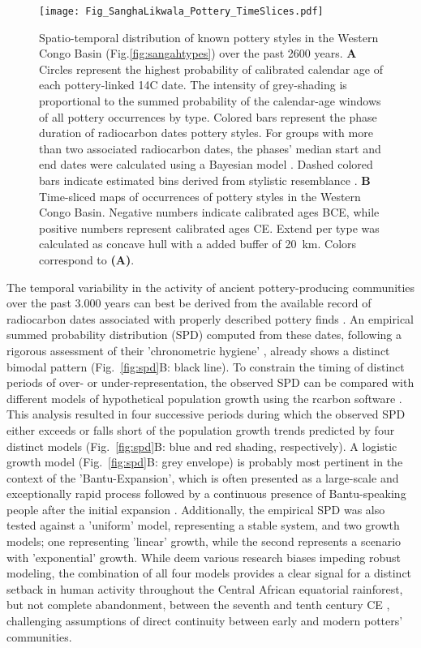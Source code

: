 \documentclass[smallextended,natbib]{svjour3}       %
\begin{document}
\begin{figure}[p]
	\centering
	\texttt{[image: Fig\_SanghaLikwala\_Pottery\_TimeSlices.pdf]}
	\caption{Spatio-temporal distribution of known pottery styles in the Western Congo Basin (Fig.\ref{fig:sangahtypes}) over the past 2600 years. \textbf{A} Circles represent the highest probability of calibrated calendar age of each pottery-linked 14C date. The intensity of grey-shading is proportional to the summed probability of the calendar-age windows of all pottery occurrences by type. Colored bars represent the phase duration of radiocarbon dates pottery styles. For groups with more than two associated radiocarbon dates, the phases' median start and end dates were calculated using a Bayesian model \citep[Fig.~S1,Tab.~S1]{Crema.2021a,Crema.2021b,Seidensticker.2024}. Dashed colored bars indicate estimated bins derived from stylistic resemblance \citep[Data S2]{Seidensticker.2021}. \textbf{B} Time-sliced maps of occurrences of pottery styles in the Western Congo Basin. Negative numbers indicate calibrated ages BCE, while positive numbers represent calibrated ages CE. Extend per type was calculated as concave hull \citep{Gombin.2017} with a added buffer of 20~km. Colors correspond to \textbf{(A)}.}
	\label{fig:timeslicemaps}
\end{figure}

The temporal variability in the activity of ancient pottery-producing communities over the past 3.000 years can best be derived from the available record of radiocarbon dates associated with properly described pottery finds \citep{Seidensticker.2021f}. An empirical summed probability distribution (SPD) computed from these dates, following a rigorous assessment of their 'chronometric hygiene' \citep{Napolitano.2019}, already shows a distinct bimodal pattern (Fig.~\ref{fig:spd}B: black line). To constrain the timing of distinct periods of over- or under-representation, the observed SPD can be compared with different models of hypothetical population growth using the rcarbon software \citep{Bevan.2022}. This analysis resulted in four successive periods during which the observed SPD either exceeds or falls short of the population growth trends predicted by four distinct models (Fig.~\ref{fig:spd}B: blue and red shading, respectively). A logistic growth model (Fig.~\ref{fig:spd}B: grey envelope) is probably most pertinent in the context of the 'Bantu-Expansion', which is often presented as a large-scale and exceptionally rapid process followed by a continuous presence of Bantu-speaking people after the initial expansion \citep{Pakendorf.2011,Grollemund.2015,Bostoen.2015,Bostoen.2022,Koile.2022}. Additionally, the empirical SPD was also tested against a 'uniform' model, representing a stable system, and two growth models; one representing 'linear' growth, while the second represents a scenario with 'exponential' growth. While \citet{Clist.2023a} deem various research biases impeding robust modeling, the combination of all four models provides a clear signal for a distinct setback in human activity throughout the Central African equatorial rainforest, but not complete abandonment, between the seventh and tenth century CE \citep{Seidensticker.2021f}, challenging assumptions of direct continuity between early and modern potters' communities. 
\end{document}
